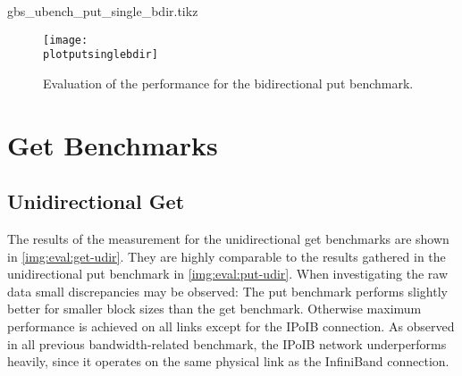 \newcommand{\plotputsinglebdir}{gbs_ubench_put_single_bdir.tikz}
\begin{filecontents}{\plotputsinglebdir}
\newcommand{\csv}{gbs_ubench_put_single_bdir.csv}
\newcommand{\csvgi}{result-gi/\csv}
\newcommand{\csvte}{result-te/\csv}
\newcommand{\csvipoib}{result-ipoib/\csv}
\newcommand{\csvib}{result-ib/\csv}

\end{filecontents}


\begin{figure}[htb]
\centering
\texttt{[image: \\plotputsinglebdir]}
\caption{Evaluation of the performance for the bidirectional put benchmark.}
\label{img:eval:put-bdir}
\end{figure}

\section{Get Benchmarks}

\subsection{Unidirectional Get}

The results of the measurement for the unidirectional get benchmarks are shown in \autoref{img:eval:get-udir}. They are highly comparable to the results gathered in the unidirectional put benchmark in \autoref{img:eval:put-udir}. When investigating the raw data small discrepancies may be observed: The put benchmark performs slightly better for smaller block sizes than the get benchmark. Otherwise maximum performance is achieved on all links except for the \ac{IPoIB} connection. As observed in all previous bandwidth-related benchmark, the \ac{IPoIB} network underperforms heavily, since it operates on the same physical link as the InfiniBand connection.

